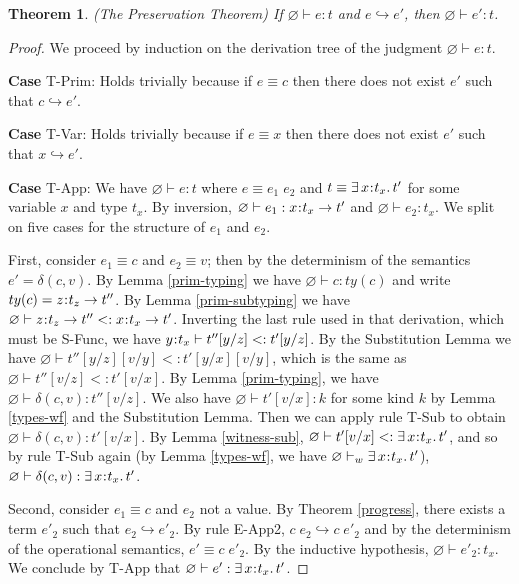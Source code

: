 \documentclass[11pt]{article}
\newtheorem{theorem}{Theorem}%
\newcommand{\bind}{\hspace{0.05em}{:}\hspace{0.05em}} %
\newcommand{\step}{\hookrightarrow}
\newcommand{\existype}[3]{\exists\, #1\bind #2.\, #3}
\newcommand{\functype}[3]{#1\bind #2 \rightarrow #3}
\begin{document}
\begin{theorem}(The Preservation Theorem)
If $\varnothing \vdash e : t$ and $e \hookrightarrow e'$, then $\varnothing \vdash e' : t$.	
\end{theorem} 
\begin{proof} 
We proceed by induction on the derivation tree of the judgment $\varnothing \vdash e : t$.

{\bf Case} {\sc T-Prim}: Holds trivially because if $e \equiv c$ then there does not exist $e'$ such that $c \hookrightarrow e'$.

{\bf Case} {\sc T-Var}: Holds trivially because if $e \equiv x$ then there does not exist $e'$ such that $x \hookrightarrow e'$.


{\bf Case} {\sc T-App}: We have $\varnothing \vdash e : t$ where $e \equiv e_1\; e_2$ and $t \equiv \existype{x}{t_x}{t'}$ for some variable $x$ and type $t_x$. By inversion, $\varnothing \vdash e_1 : \functype{x}{t_x}{t'}$ and $\varnothing \vdash e_2 : t_x$. We split on five cases for the structure of $e_1$ and $e_2$.

First, consider $e_1 \equiv c$ and $e_2 \equiv v$; then by the determinism of the semantics $e' = \delta(c,v)$. By Lemma \ref{prim-typing} we have $\varnothing \vdash c : ty(c)$ and write $ty(c) = \functype{z}{t_z}{t''}$. By Lemma \ref{prim-subtyping} we have $\varnothing \vdash \functype{z}{t_z}{t''} <: \functype{x}{t_x}{t'}$. Inverting the last rule used in that derivation, which must be {\sc S-Func}, we have $y\bind t_x \vdash t''[y/z] <: t'[y/z]$. By the Substitution Lemma we have $\varnothing \vdash t''[y/z][v/y] <: t'[y/x][v/y]$, which is the same as $\varnothing \vdash t''[v/z] <: t'[v/x]$.
By Lemma \ref{prim-typing}, we have $\varnothing \vdash \delta(c,v) : t''[v/z]$. We also have $\varnothing \vdash t'[v/x] : k$ for some kind $k$ by Lemma \ref{types-wf} and the Substitution Lemma. Then we can apply rule {\sc T-Sub} to obtain $\varnothing \vdash \delta(c,v) : t'[v/x]$. By Lemma \ref{witness-sub}, $\varnothing \vdash t'[v/x] <: \existype{x}{t_x}{t'}$, and so by rule {\sc T-Sub} again (by Lemma \ref{types-wf}, we have $\varnothing \vdash_w \existype{x}{t_x}{t'}$), $\varnothing \vdash \delta(c,v) : \existype{x}{t_x}{t'} $.

Second, consider $e_1 \equiv c$ and $e_2$ not a value. By Theorem \ref{progress}, there exists a term $e'_2$ such that $e_2 \step e'_2$. By rule {\sc E-App2}, $c\; e_2 \step c\; e'_2$ and by the determinism of the operational semantics, $e' \equiv c\; e'_2$. By the inductive hypothesis, $\varnothing \vdash e'_2 : t_x$. We conclude by {\sc T-App} that $\varnothing \vdash e' : \existype{x}{t_x}{t'}$.


\end{proof}
\end{document}
